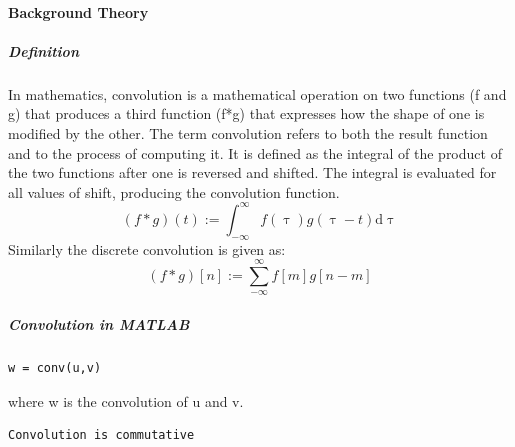 \documentclass[12pt]{article}
\begin{document}
\paragraph{Background Theory}
\subparagraph{Definition\\}
In mathematics, convolution is a mathematical operation on two functions (f and g) that produces a third function (f*g) that expresses how the shape of one is modified by the other. 
The term convolution refers to both the result function and to the process of computing it. 
It is defined as the integral of the product of the two functions after one is reversed and shifted. 
The integral is evaluated for all values of shift, producing the convolution function.
\begin{equation}
	(f * g)(t) := \int_{-\infty}^\infty f(\uptau)g(\uptau-t)\mathrm{d}\uptau
\end{equation}
Similarly the discrete convolution is given as:
\begin{equation}
	(f * g)[n] := \sum_{-\infty}^\infty f[m]g[n-m] 
\end{equation}
\subparagraph{Convolution in MATLAB\\}
\begin{verbatim}
w = conv(u,v)
\end{verbatim}
 where w is the convolution of u and v.
\begin{verbatim}
Convolution is commutative
\end{verbatim}
\pagebreak
\end{document}
